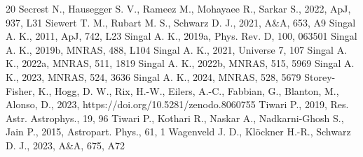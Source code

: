\documentclass[fleqn,usenatbib]{mnras}
\begin{document}
\begin{thebibliography}{20}
  Secrest N., Hausegger S. V., Rameez M., Mohayaee R., Sarkar S., 2022, ApJ, 937, L31
 Siewert T. M., Rubart M. S., Schwarz D. J., 2021, A\&A, 653, A9
 Singal A. K., 2011, ApJ, 742, L23 
 Singal A. K., 2019a, Phys. Rev. D, 100, 063501
 Singal A. K., 2019b, MNRAS, 488, L104 
 Singal A. K., 2021, Universe 7, 107
 Singal A. K., 2022a, MNRAS,  511, 1819
 Singal A. K., 2022b, MNRAS,  515, 5969
 Singal A. K., 2023, MNRAS,  524, 3636
 Singal A. K., 2024, MNRAS,  528, 5679
Storey-Fisher, K., Hogg, D. W., Rix, H.-W., Eilers, A.-C., Fabbian, G., Blanton, M., Alonso, D., 2023, 
https://doi.org/10.5281/zenodo.8060755
 Tiwari P., 2019, Res. Astr. Astrophys., 19, 96
 Tiwari P., Kothari R., Naskar A., Nadkarni-Ghosh S., Jain P., 2015, Astropart. Phys., 61, 1
 Wagenveld J. D., Kl\"ockner  H.-R., Schwarz D. J., 2023,  A\&A, 675, A72 
\end{thebibliography}
\end{document}
